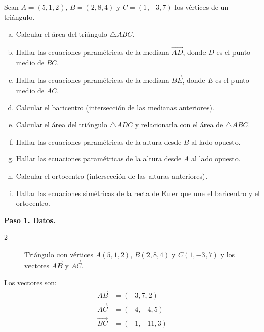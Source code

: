 \begin{prob} Sean $A=(5,1,2)$, $B=(2,8,4)$ y $C=(1,-3,7)$ los vértices de un triángulo.

\begin{enumerate}[a)]
\item Calcular el área del triángulo $\triangle ABC$.
\item Hallar las ecuaciones paramétricas de la mediana $\overrightarrow{AD}$, donde $D$ es el punto medio de $\overline{BC}$.
\item Hallar las ecuaciones paramétricas de la mediana $\overrightarrow{BE}$, donde $E$ es el punto medio de $\overline{AC}$.
\item Calcular el baricentro (intersección de las medianas anteriores).
\item Calcular el área del triángulo $\triangle ADC$ y relacionarla con el área de $\triangle ABC$.
\item Hallar las ecuaciones paramétricas de la altura desde $B$ al lado opuesto.
\item Hallar las ecuaciones paramétricas de la altura desde $A$ al lado opuesto.
\item Calcular el ortocentro (intersección de las alturas anteriores).
\item Hallar las ecuaciones simétricas de la recta de Euler que une el baricentro y el ortocentro.
\end{enumerate}

\begin{myproof}
\textbf{Paso 1. Datos.}
\begin{multicols}{2}
\begin{figure}[H]
\centering
{}
\caption{Triángulo con vértices $A(5,1,2)$, $B(2,8,4)$ y $C(1,-3,7)$ y los vectores $\overrightarrow{AB}$ y $\overrightarrow{AC}$.}
\label{fig:triangulo_euler_datos}
\end{figure}

Los vectores son:
\begin{align*}
\overrightarrow{AB} &= (-3,7,2) \\
\overrightarrow{AC} &= (-4,-4,5) \\
\overrightarrow{BC} &= (-1,-11,3)
\end{align*}
\end{multicols}


\end{myproof}
\end{prob}
